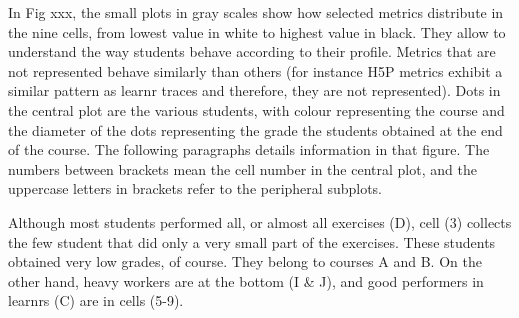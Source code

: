 \documentclass[
]{article}
\begin{document}
In Fig xxx, the small plots in gray scales show how selected metrics
distribute in the nine cells, from lowest value in white to highest
value in black. They allow to understand the way students behave
according to their profile. Metrics that are not represented behave
similarly than others (for instance H5P metrics exhibit a similar
pattern as learnr traces and therefore, they are not represented). Dots
in the central plot are the various students, with colour representing
the course and the diameter of the dots representing the grade the
students obtained at the end of the course. The following paragraphs
details information in that figure. The numbers between brackets mean
the cell number in the central plot, and the uppercase letters in
brackets refer to the peripheral subplots.

Although most students performed all, or almost all exercises (D), cell
(3) collects the few student that did only a very small part of the
exercises. These students obtained very low grades, of course. They
belong to courses A and B. On the other hand, heavy workers are at the
bottom (I \& J), and good performers in learnrs (C) are in cells (5-9).
\end{document}
